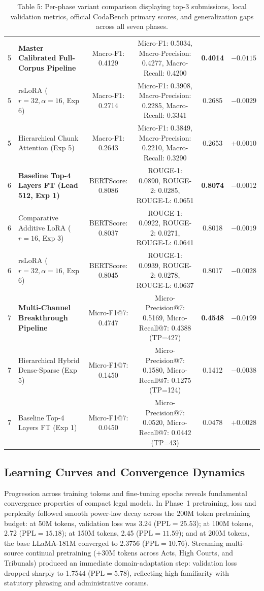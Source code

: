 \documentclass[11pt, oneside]{article}
\begin{document}
\begin{table}[htbp]
{\begin{tabular}{clcccc}
\midrule
5 & \textbf{Master Calibrated Full-Corpus Pipeline} & Macro-F1: 0.4129 & Micro-F1: 0.5034, Macro-Precision: 0.4277, Macro-Recall: 0.4200 & \textbf{0.4014} & $-0.0115$ \\
5 & rsLoRA ($r=32, \alpha=16$, Exp 6) & Macro-F1: 0.2714 & Micro-F1: 0.3908, Macro-Precision: 0.2285, Macro-Recall: 0.3341 & 0.2685 & $-0.0029$ \\
5 & Hierarchical Chunk Attention (Exp 5) & Macro-F1: 0.2643 & Micro-F1: 0.3849, Macro-Precision: 0.2210, Macro-Recall: 0.3290 & 0.2653 & $+0.0010$ \\
\midrule
6 & \textbf{Baseline Top-4 Layers FT (Lead 512, Exp 1)} & BERTScore: 0.8086 & ROUGE-1: 0.0890, ROUGE-2: 0.0285, ROUGE-L: 0.0651 & \textbf{0.8074} & $-0.0012$ \\
6 & Comparative Additive LoRA ($r=16$, Exp 3) & BERTScore: 0.8037 & ROUGE-1: 0.0922, ROUGE-2: 0.0271, ROUGE-L: 0.0641 & 0.8018 & $-0.0019$ \\
6 & rsLoRA ($r=32, \alpha=16$, Exp 6) & BERTScore: 0.8045 & ROUGE-1: 0.0939, ROUGE-2: 0.0278, ROUGE-L: 0.0637 & 0.8017 & $-0.0028$ \\
\midrule
7 & \textbf{Multi-Channel Breakthrough Pipeline} & Micro-F1@7: 0.4747 & Micro-Precision@7: 0.5169, Micro-Recall@7: 0.4388 (TP=427) & \textbf{0.4548} & $-0.0199$ \\
7 & Hierarchical Hybrid Dense-Sparse (Exp 5) & Micro-F1@7: 0.1450 & Micro-Precision@7: 0.1580, Micro-Recall@7: 0.1275 (TP=124) & 0.1412 & $-0.0038$ \\
7 & Baseline Top-4 Layers FT (Exp 1) & Micro-F1@7: 0.0450 & Micro-Precision@7: 0.0520, Micro-Recall@7: 0.0442 (TP=43) & 0.0478 & $+0.0028$ \\
\bottomrule
\end{tabular}
}
\caption{Table 5: Per-phase variant comparison displaying top-3 submissions, local validation metrics, official CodaBench primary scores, and generalization gaps across all seven phases.}
\label{tab:variant_comparison}
\end{table}

\subsection{Learning Curves and Convergence Dynamics}
Progression across training tokens and fine-tuning epochs reveals fundamental convergence properties of compact legal models.
In Phase~1 pretraining, loss and perplexity followed smooth power-law decay across the 200M token pretraining budget: at 50M tokens, validation loss was 3.24 ($\text{PPL}=25.53$); at 100M tokens, 2.72 ($\text{PPL}=15.18$); at 150M tokens, 2.45 ($\text{PPL}=11.59$); and at 200M tokens, the base LLaMA-181M converged to 2.3756 ($\text{PPL}=10.76$). Streaming multi-source continual pretraining (+30M tokens across Acts, High Courts, and Tribunals) produced an immediate domain-adaptation step: validation loss dropped sharply to 1.7544 ($\text{PPL}=5.78$), reflecting high familiarity with statutory phrasing and administrative corams.
\end{document}
